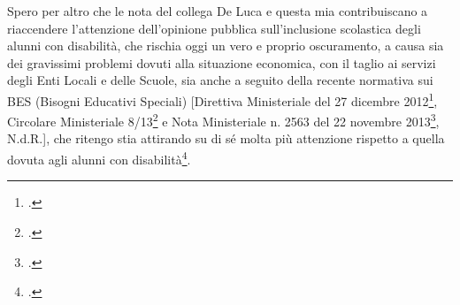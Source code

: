 Spero per altro che le nota del collega De Luca e questa mia contribuiscano a riaccendere l'attenzione dell'opinione pubblica sull'inclusione scolastica degli alunni con disabilità, che rischia oggi un vero e proprio oscuramento, a causa sia dei gravissimi problemi dovuti alla situazione economica, con il taglio ai servizi degli Enti Locali e delle Scuole, sia anche a seguito della recente normativa sui BES (Bisogni Educativi Speciali) [Direttiva Ministeriale del 27 dicembre 2012\footcite{dir27Dic2012}, Circolare Ministeriale 8/13\footcite{cm8_2013} e Nota Ministeriale n. 2563 del 22 novembre 2013\footcite{Nota_2563_2013}, N.d.R.], che ritengo stia attirando su di sé molta più attenzione rispetto a quella dovuta agli alunni con disabilità\footcite{Nocera2014}.